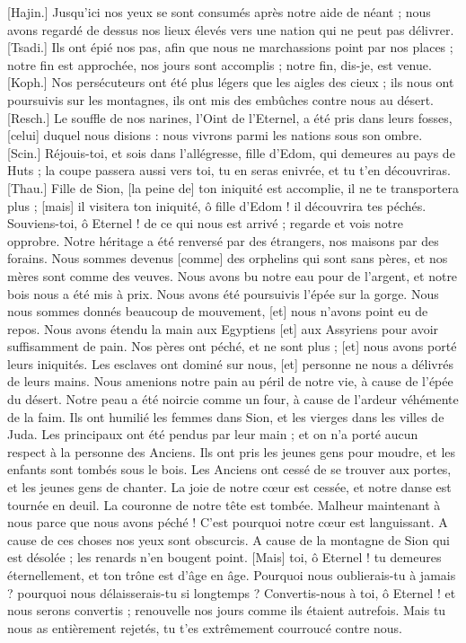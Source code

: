 \begin{multicols}{2}
[Hajin.] Jusqu’ici nos yeux se sont consumés après notre aide de néant ; nous avons regardé de dessus nos lieux élevés vers une nation qui ne peut pas délivrer.
[Tsadi.] Ils ont épié nos pas, afin que nous ne marchassions point par nos places ; notre fin est approchée, nos jours sont accomplis ; notre fin, dis-je, est venue.
[Koph.] Nos persécuteurs ont été plus légers que les aigles des cieux ; ils nous ont poursuivis sur les montagnes, ils ont mis des embûches contre nous au désert.
[Resch.] Le souffle de nos narines, l’Oint de l’Eternel, a été pris dans leurs fosses, [celui] duquel nous disions : nous vivrons parmi les nations sous son ombre.
[Scin.] Réjouis-toi, et sois dans l’allégresse, fille d’Edom, qui demeures au pays de Huts ; la coupe passera aussi vers toi, tu en seras enivrée, et tu t’en découvriras.
[Thau.] Fille de Sion, [la peine de] ton iniquité est accomplie, il ne te transportera plus ; [mais] il visitera ton iniquité, ô fille d’Edom ! il découvrira tes péchés.
\VerseOne{}Souviens-toi, ô Eternel ! de ce qui nous est arrivé ; regarde et vois notre opprobre.
Notre héritage a été renversé par des étrangers, nos maisons par des forains.
Nous sommes devenus [comme] des orphelins qui sont sans pères, et nos mères sont comme des veuves.
Nous avons bu notre eau pour de l’argent, et notre bois nous a été mis à prix.
Nous avons été poursuivis l’épée sur la gorge. Nous nous sommes donnés beaucoup de mouvement, [et] nous n’avons point eu de repos.
Nous avons étendu la main aux Egyptiens [et] aux Assyriens pour avoir suffisamment de pain.
Nos pères ont péché, et ne sont plus ; [et] nous avons porté leurs iniquités.
Les esclaves ont dominé sur nous, [et] personne ne nous a délivrés de leurs mains.
Nous amenions notre pain au péril de notre vie, à cause de l’épée du désert.
Notre peau a été noircie comme un four, à cause de l’ardeur véhémente de la faim.
Ils ont humilié les femmes dans Sion, et les vierges dans les villes de Juda.
Les principaux ont été pendus par leur main ; et on n’a porté aucun respect à la personne des Anciens.
Ils ont pris les jeunes gens pour moudre, et les enfants sont tombés sous le bois.
Les Anciens ont cessé de se trouver aux portes, et les jeunes gens de chanter.
La joie de notre cœur est cessée, et notre danse est tournée en deuil.
La couronne de notre tête est tombée. Malheur maintenant à nous parce que nous avons péché !
C’est pourquoi notre cœur est languissant. A cause de ces choses nos yeux sont obscurcis.
A cause de la montagne de Sion qui est désolée ; les renards n’en bougent point.
[Mais] toi, ô Eternel ! tu demeures éternellement, et ton trône est d’âge en âge.
Pourquoi nous oublierais-tu à jamais ? pourquoi nous délaisserais-tu si longtemps ?
Convertis-nous à toi, ô Eternel ! et nous serons convertis ; renouvelle nos jours comme ils étaient autrefois.
Mais tu nous as entièrement rejetés, tu t’es extrêmement courroucé contre nous.
\PPE{}
\end{multicols}
